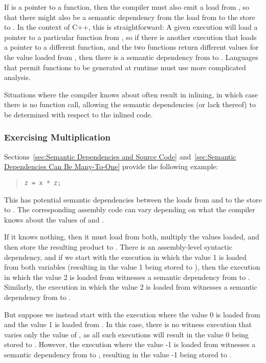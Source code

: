 If  is a pointer to a function, then the compiler must also emit
a load from , so that there might also be a semantic dependency
from the load from  to the store to .
In the context of C++, this is straightforward:
A given execution will load a pointer to a particular function from
, so if there is another execution that loads a pointer to a
different function, and the two functions return different values for
the value loaded from , then there is a semantic dependency from
 to .
Languages that permit functions to be generated at runtime must use
more complicated analysis.

Situations where the compiler knows about  often result in
inlining, in which case there is no function call, allowing the semantic
dependencies (or lack thereof) to be determined with respect to the
inlined code.

\subsubsection{Exercising Multiplication}
\label{sec:Exercising Multiplication}

Sections~\ref{sec:Semantic Dependencies and Source Code}
and~\ref{sec:Semantic Dependencies Can Be Many-To-One}
provide the following example:
\begin{quote}
\begin{verbatim}
z = x * z;
\end{verbatim}
\end{quote}
This has potential semantic dependencies between the loads from 
and  to the store to .
The corresponding assembly code can vary depending on what the compiler
knows about the values of  and .

If it knows nothing, then it must load from both, multiply the values
loaded, and then store the resulting product to .
There is an assembly-level syntactic dependency, and if we start
with the execution in which the value 1 is loaded from both variables
(resulting in the value 1 being stored to ),
then the execution in which the value 2 is loaded from  witnesses
a semantic dependency from  to .
Similarly, the execution in which the value 2 is loaded from 
witnesses a semantic dependency from  to .

But suppose we instead start with the execution where the value 0
is loaded from  and the value 1 is loaded from .
In this case, there is no witness execution that varies only the value
of , as all such executions will result in the value 0 being stored
to .
However, the execution where the value -1 is loaded from 
witnesses a semantic dependency from  to , resulting in
the value -1 being stored to .

